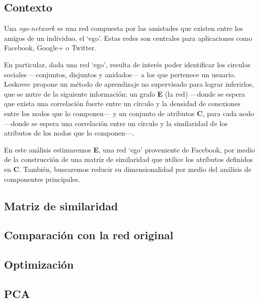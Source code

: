 
\vspace{2em}
\subsection{Contexto} Una \textit{ego-network} \cite{Leskovec} es una red compuesta por las amistades que existen entre los amigos de un individuo, el `ego'. Estas redes son centrales para aplicaciones como Facebook, Google+ o Twitter. 

En particular, dada una red `ego', resulta de interés poder identificar los circulos sociales ---conjuntos, disjuntos y anidados--- a los que pertenece un usuario. Leskovec \cite{Leskovec} propone un método de aprendizaje no supervisado para lograr inferirlos, que se nutre de la siguiente información: un grafo \textbf{E} (la red) ---donde se espera que exista una correlación fuerte entre un círculo y la densidad de conexiones entre los nodos que lo componen--- y un conjunto de atributos \textbf{C}, para cada nodo ---donde se espera una correlación entre un círculo y la similaridad de los atributos de los nodos que lo componen---.

\vspace{1em}
En este análisis estimaremos \textbf{E}, una red `ego' proveniente de Facebook, por medio de la construcción de una matriz de similaridad que utilice los atributos definidos en \textbf{C}. También, buscaremos reducir su dimensionalidad por medio del análisis de componentes principales.





\vspace{2em}
\subsection{Matriz de similaridad}





\vspace{2em}
\subsection{Comparación con la red original}





\vspace{2em}
\subsection{Optimización}





\vspace{2em}
\subsection{PCA}
